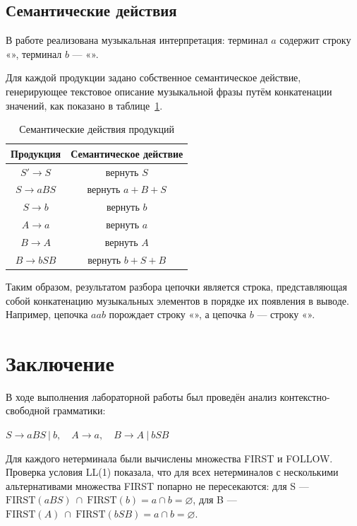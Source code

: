 \documentclass[a4paper,final]{article}
\begin{document}
\subsection{Семантические действия}

В работе реализована музыкальная интерпретация: терминал $a$ содержит
строку «\twonotes», терминал $b$ — «\quarternote».

Для каждой продукции задано собственное семантическое действие,
генерирующее текстовое описание музыкальной фразы путём конкатенации
значений, как показано в таблице~\ref{tab:sem}.

\begin{table}[h]
\centering
\caption{Семантические действия продукций}
\label{tab:sem}
\begin{tabular}{|c|c|}
\hline
\textbf{Продукция} & \textbf{Семантическое действие} \\
\hline
$S' \to S$   & вернуть $S$ \\
\hline
$S \to aBS$  & вернуть $a + B + S$ \\
\hline
$S \to b$    & вернуть $b$ \\
\hline
$A \to a$    & вернуть $a$ \\
\hline
$B \to A$    & вернуть $A$ \\
\hline
$B \to bSB$  & вернуть $b + S + B$ \\
\hline
\end{tabular}
\end{table}

Таким образом, результатом разбора цепочки является строка,
представляющая собой конкатенацию музыкальных элементов в порядке
их появления в выводе. Например, цепочка $aab$ порождает строку
«\twonotes \twonotes \quarternote», а цепочка $b$ — строку «\quarternote».

\newpage
\section*{Заключение}
В ходе выполнения лабораторной работы был проведён анализ контекстно-свободной грамматики:

$S \rightarrow aBS ~|~ b,\quad A \rightarrow a,\quad B \rightarrow A ~|~ bSB$

Для каждого нетерминала были вычислены множества FIRST и FOLLOW. Проверка условия LL(1) показала, что для всех нетерминалов с несколькими альтернативами множества FIRST попарно не пересекаются: для S — $\text{FIRST}(aBS) ~\cap~ \text{FIRST}(b) = {a} \cap {b} = \varnothing$, для B — $\text{FIRST}(A) ~\cap~ \text{FIRST}(bSB) = {a} \cap {b} = \varnothing$.
\end{document}

